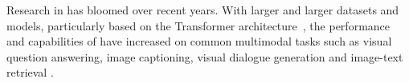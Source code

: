 
%
%
%
%
%
%
%

Research in  has bloomed over recent years. With larger and
larger datasets and models, particularly based on the
Transformer architecture~\citep{vaswani2017attention}, the performance and
capabilities of  have increased on common multimodal tasks such
as visual question answering, image captioning, visual dialogue generation and
image-text retrieval
\citep{alayrac2022flamingo,li2022blip,li2023blip2,radford2021clip}.

